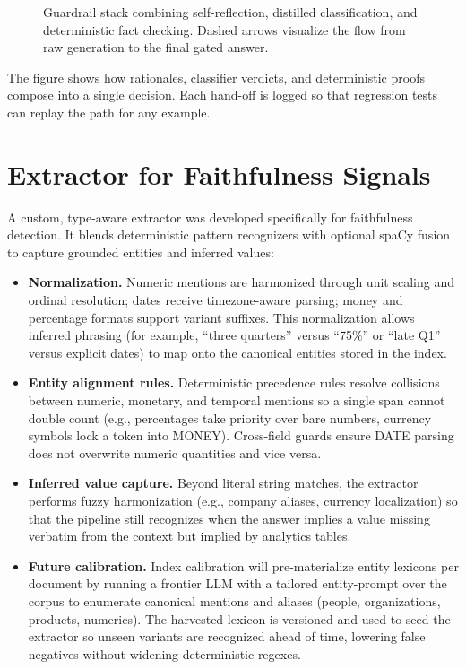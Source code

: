 \documentclass[11pt]{article}
\begin{document}
\begin{figure}[ht]
  \centering
  
  \caption{Guardrail stack combining self-reflection, distilled classification, and deterministic fact checking. Dashed arrows visualize the flow from raw generation to the final gated answer.}
\end{figure}

The figure shows how rationales, classifier verdicts, and deterministic proofs compose into a single decision. Each hand-off is logged so that regression tests can replay the path for any example.

\section{Extractor for Faithfulness Signals}
A custom, type-aware extractor was developed specifically for faithfulness detection. It blends deterministic pattern recognizers with optional spaCy fusion to capture grounded entities and inferred values:
\begin{itemize}
  \item \textbf{Normalization.} Numeric mentions are harmonized through unit scaling and ordinal resolution; dates receive timezone-aware parsing; money and percentage formats support variant suffixes. This normalization allows inferred phrasing (for example, ``three quarters'' versus ``75\%'' or ``late Q1'' versus explicit dates) to map onto the canonical entities stored in the index.
  \item \textbf{Entity alignment rules.} Deterministic precedence rules resolve collisions between numeric, monetary, and temporal mentions so a single span cannot double count (e.g., percentages take priority over bare numbers, currency symbols lock a token into MONEY). Cross-field guards ensure DATE parsing does not overwrite numeric quantities and vice versa.
  \item \textbf{Inferred value capture.} Beyond literal string matches, the extractor performs fuzzy harmonization (e.g., company aliases, currency localization) so that the pipeline still recognizes when the answer implies a value missing verbatim from the context but implied by analytics tables.
  \item \textbf{Future calibration.} Index calibration will pre-materialize entity lexicons per document by running a frontier LLM with a tailored entity-prompt over the corpus to enumerate canonical mentions and aliases (people, organizations, products, numerics). The harvested lexicon is versioned and used to seed the extractor so unseen variants are recognized ahead of time, lowering false negatives without widening deterministic regexes.
\end{itemize}
\end{document}
